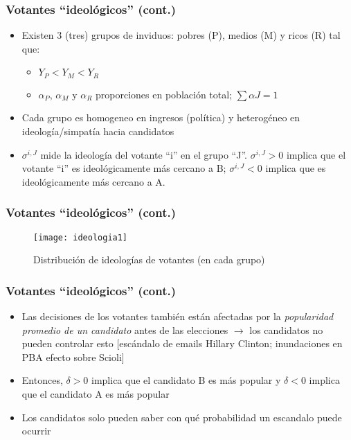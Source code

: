 \documentclass[14pt,aspectratio=169]{beamer}
\begin{document}
\begin{frame}\frametitle{Votantes ``ideológicos'' (cont.)}
\begin{itemize}
\item Existen 3 (tres) grupos de inviduos: pobres (P), medios (M) y
  ricos (R) tal que:
  \begin{itemize}\itemsep 5pt \medskip
  \item $Y_{P}<Y_{M}<Y_{R}$
    \item $\alpha_{P}$, $\alpha_{M}$ y $\alpha_{R}$ proporciones en
      población total; $\sum \alpha{J}=1$
    \end{itemize}
    \item Cada grupo es homogeneo en ingresos (política) y
      heterogéneo en ideología/simpatía hacia candidatos
      \item $\sigma^{i,J}$ mide la ideología del votante ``i'' en el
        grupo ``J''. $\sigma^{i,J}>0$ implica que el votante ``i'' es
        ideológicamente más cercano a B; $\sigma^{i,J}<0$
        implica que es ideológicamente más cercano a A. 
\end{itemize}
\end{frame}


\begin{frame}\frametitle{Votantes ``ideológicos'' (cont.)}
\begin{figure}[htbp]
    \centering 
    \texttt{[image: ideologia1]}
    \caption{Distribución de ideologías de votantes (en cada grupo)}
    \label{fig:baron1}
  \end{figure}
\end{frame}

\begin{frame}\frametitle{Votantes ``ideológicos'' (cont.)}
\begin{itemize}
\item Las decisiones de los votantes también están afectadas por la
  \textit{popularidad promedio de un candidato} antes de las
  elecciones $\longrightarrow$ los candidatos no pueden controlar esto
  [escándalo de emails Hillary Clinton; inundaciones en PBA efecto
  sobre Scioli]
  \item Entonces, $\delta>0$ implica que el candidato B es más popular
    y $\delta<0$ implica que el candidato A es más popular
\item Los candidatos solo pueden saber con qué probabilidad un
  escandalo puede ocurrir
  \end{itemize}
\end{frame}
\end{document}
